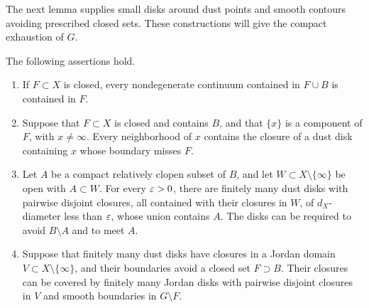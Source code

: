 The next lemma supplies small disks around dust points and smooth
contours avoiding prescribed closed sets.  These constructions will
give the compact exhaustion of $G$.

\begin{lemma}\label{lem:dust-disks}
The following assertions hold.
\begin{enumerate}[label=\textup{(\roman*)}]
\item If $F\subset X$ is closed, every nondegenerate continuum contained
in $F\cup B$ is contained in $F$.
\item Suppose that $F\subset X$ is closed and contains $B$, and that
$\{x\}$ is a component of $F$, with $x\ne\infty$.  Every neighborhood
of $x$ contains the closure of a dust disk containing $x$ whose boundary
misses $F$.
\item Let $A$ be a compact relatively clopen subset of $B$, and let
$W\subset X\setminus\{\infty\}$ be open with $A\subset W$.
For every $\varepsilon>0$, there are finitely many dust disks with pairwise
disjoint closures, all contained with their closures in $W$, of
$d_X$-diameter less than $\varepsilon$, whose union contains $A$.
The disks can be required to avoid $B\setminus A$ and to meet $A$.
\item Suppose that finitely many dust disks have closures in a Jordan
domain $V\subset X\setminus\{\infty\}$, and their boundaries avoid a
closed set $F\supset B$.  Their closures can be covered by finitely many
Jordan disks with pairwise disjoint closures in $V$ and smooth
boundaries in $G\setminus F$.
\end{enumerate}
\end{lemma}

